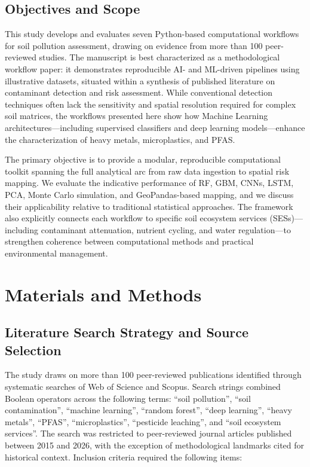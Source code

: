 \documentclass[environremediat,article,accept,pdftex,oneauthor]{Definitions/mdpi}
\begin{document}
\subsection{{Objectives and Scope}}\label{sec1.3}

{This study develops and evaluates seven Python-based computational workflows for soil pollution assessment, drawing on evidence from more than 100 peer-reviewed studies. The manuscript is best characterized as a methodological workflow paper: it demonstrates reproducible AI- and ML-driven pipelines using illustrative  datasets, situated within a synthesis of published literature on contaminant detection and risk assessment. While conventional detection techniques often lack the sensitivity and spatial resolution required for complex soil matrices, the workflows presented here show how Machine Learning architectures---including supervised classifiers and deep learning models---enhance the characterization of heavy metals, microplastics, and PFAS}.

{The primary objective is to provide a modular, reproducible computational toolkit spanning the full analytical arc from raw data ingestion to spatial risk mapping. We evaluate the indicative performance of RF, GBM, CNNs, LSTM, PCA, Monte Carlo simulation, and GeoPandas-based mapping, and we discuss their applicability relative to traditional statistical approaches. The framework also explicitly connects each workflow to specific soil ecosystem services (SESs)---including contaminant attenuation, nutrient cycling, and water regulation---to strengthen coherence between computational methods and practical environmental management.}

\section{Materials and Methods}\label{sec2}

\subsection{Literature Search Strategy and Source Selection}\label{sec2.0.1}

{The study draws on more than 100 peer-reviewed publications
identified through systematic searches of Web of Science and Scopus.
Search strings combined Boolean operators across the following terms:
``soil pollution'', ``soil contamination'', ``machine learning'',
``random forest'', ``deep learning'', ``heavy metals'', ``PFAS'',
``microplastics'', ``pesticide leaching'', and ``soil ecosystem
services''. The search was restricted to peer-reviewed journal articles
published between 2015 and 2026, with the exception of methodological
landmarks cited for historical context. Inclusion criteria required the following items}:
\end{document}
